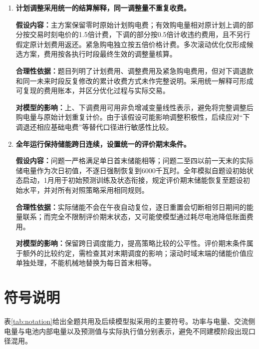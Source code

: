 \documentclass[UTF8,a4paper,12pt,fontset=fandol]{ctexart}
\numberwithin{equation}{section}
\begin{document}
\begin{enumerate}[label=\textbf{假设\arabic*：},leftmargin=4.5em]
\item \textbf{计划调整采用统一的结算解释，同一调整量不重复收费。}

\textbf{假设内容：}主方案保留零时原始计划购电费；有效购电量相对原计划上调的部分按交易时刻电价的1.5倍计费，下调的部分按0.5倍计收违约费用，且不另行假定原计划费用返还。紧急购电独立按五倍价格计费。多次滚动优化仅形成候选方案，费用按各执行时段最终生效的调整量核算。

\textbf{合理性依据：}题目列明了计划费用、调整费用及紧急购电费用，但对下调退款和同一未来时段反复修改的累计收费方式未作完整说明。采用统一解释可形成可复现的费用账本，并区分优化过程与实际交易。

\textbf{对模型的影响：}上、下调费用可用非负增减变量线性表示，避免将完整调整后购电量与原始计划重复计价。由于该假设可能影响调整积极性，后续应对“下调退还相应基础电费”等替代口径进行敏感性比较。

\item \textbf{全年运行保持储能跨日连续，设置统一的评价期末条件。}

\textbf{假设内容：}问题一严格满足单日首末储能相等；问题二至四以前一天末的实际储电量作为次日初值，不逐日强制恢复到6000千瓦时。全年模拟自题设初始状态启动，1月用于初始预测训练及状态衔接，规定评价期末储能恢复至题设初始水平，并对所有对照策略采用相同规则。

\textbf{合理性依据：}实际储能不会在午夜自动复位，逐日重置会切断相邻日期间的能量联系；而完全不限制评价期末状态，又可能使模型通过耗尽电池降低账面费用。

\textbf{对模型的影响：}保留跨日调度能力，提高策略比较的公平性。评价期末条件属于额外的比较约定，需检查其对末期调度的影响；滚动时域末端的储能价值应单独处理，不能机械地替换为每日首末相等。
\end{enumerate}

\section{符号说明}
\label{sec:notation}

表\ref{tab:notation}给出全题共用及后续模型拟采用的主要符号。功率与电量、交流侧电量与电池内部电量以及预测值与实际执行值分别表示，避免不同建模阶段出现口径混用。
\end{document}
